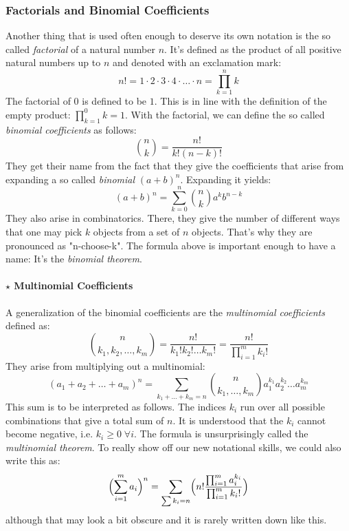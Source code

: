\subsubsection{Factorials and Binomial Coefficients}
\label{Sec:FactorialsAndBinomCoeffs}
Another thing that is used often enough to deserve its own notation is the so called \emph{factorial} of a natural number $n$. It's defined as the product of all positive natural numbers up to $n$ and denoted with an exclamation mark:
\begin{equation}
 n! = 1 \cdot 2 \cdot 3 \cdot 4 \cdot \ldots \cdot n = \prod_{k=1}^{n} k
\end{equation}
The factorial of $0$ is defined to be $1$. This is in line with the definition of the empty product: $\prod_{k=1}^{0} k = 1$. With the factorial, we can define the so called \emph{binomial coefficients} as follows:
\begin{equation}
\label{Eq:BinomialCoeffs}
 \binom{n}{k} = \frac{n!}{k! (n-k)!}
\end{equation}
They get their name from the fact that they give the coefficients that arise from expanding a so called \emph{binomial} $(a+b)^n$. Expanding it yields:
\begin{equation}
\label{Eq:BinomialTheorem}
(a+b)^n = \sum_{k=0}^{n} \binom{n}{k} a^k b^{n-k}
\end{equation}
They also arise in combinatorics. There, they give the number of different ways that one may pick $k$ objects from a set of $n$ objects. That's why they are pronounced as "n-choose-k". The formula above is important enough to have a name: It's the \emph{binomial theorem}.

\paragraph{$\star$ Multinomial Coefficients}
A generalization of the binomial coefficients are the \emph{multinomial coefficients} defined as:
\begin{equation}
\label{Eq:MultinomialCoeffs}
 \binom{n}{k_1,k_2,\ldots,k_m} 
= \frac{n!}{k_1! k_2! \ldots k_m!}
= \frac{n!}{ \prod_{i=1}^{m} k_i ! }
\end{equation}
They arise from multiplying out a multinomial:
\begin{equation}
\label{Eq:MultinomialTheorem}
(a_1 + a_2 + \ldots + a_m)^n 
= \sum_{k_1+\ldots+k_m = n} \binom{n}{k_1, \ldots, k_m} a_1^{k_1} a_2^{k_2} \ldots a_m^{k_m}
\end{equation}
This sum is to be interpreted as follows. The indices $k_i$ run over all possible combinations that give a total sum of $n$. It is understood that the $k_i$ cannot become negative, i.e. $k_i \geq 0 \; \forall i$. The formula is unsurprisingly called the \emph{multinomial theorem}. To really show off our new notational skills, we could also write this as:
\begin{equation}
\Bigl( \sum_{i=1}^{m} a_i \Bigr)^n
= \sum_{\sum k_i = n} \Bigl( n! \frac{\prod_{i=1}^{m} a_i^{k_i}} {\prod_{i=1}^{m} k_i!} \Bigr)
\end{equation}
although that may look a bit obscure and it is rarely written down like this.

